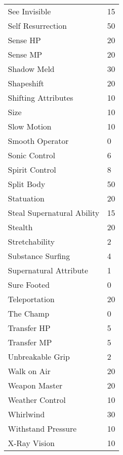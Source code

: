 \documentclass[twoside]{book}
\begin{document}
\begin{longtable}{p{1.25in}l}
      \raggedright See Invisible&15\tabularnewline
      \raggedright Self Resurrection&50\tabularnewline
      \raggedright Sense HP&20\tabularnewline
      \raggedright Sense MP&20\tabularnewline
      \raggedright Shadow Meld&30\tabularnewline
      \raggedright Shapeshift&20\tabularnewline
      \raggedright Shifting Attributes&10\tabularnewline
      \raggedright Size&10\tabularnewline
      \raggedright Slow Motion&10\tabularnewline
      \raggedright Smooth Operator&0\tabularnewline
      \raggedright Sonic Control&6\tabularnewline
      \raggedright Spirit Control&8\tabularnewline
      \raggedright Split Body&50\tabularnewline
      \raggedright Statuation&20\tabularnewline
      \raggedright Steal Supernatural Ability&15\tabularnewline
      \raggedright Stealth&20\tabularnewline
      \raggedright Stretchability&2\tabularnewline
      \raggedright Substance Surfing&4\tabularnewline
      \raggedright Supernatural Attribute&1\tabularnewline
      \raggedright Sure Footed&0\tabularnewline
      \raggedright Teleportation&20\tabularnewline
      \raggedright The Champ&0\tabularnewline
      \raggedright Transfer HP&5\tabularnewline
      \raggedright Transfer MP&5\tabularnewline
      \raggedright Unbreakable Grip&2\tabularnewline
      \raggedright Walk on Air&20\tabularnewline
      \raggedright Weapon Master&20\tabularnewline
      \raggedright Weather Control&10\tabularnewline
      \raggedright Whirlwind&30\tabularnewline
      \raggedright Withstand Pressure&10\tabularnewline
      \raggedright X-Ray Vision&10\tabularnewline
      
\end{longtable}
    
\end{document}
